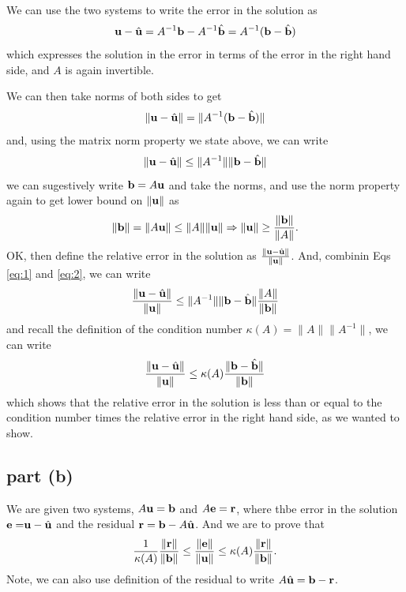 \documentclass[12pt]{article}
\begin{document}
We can use the two systems to write the error in the solution as
\begin{equation}
    {\bf u} - \hat{\bf u} = A^{-1}{\bf b} - A^{-1}\hat{\bf b} = A^{-1}({\bf b} - \hat{\bf b})
\end{equation}
which expresses the solution in the error in terms of the error in the right hand side, and $A$ is again invertible. 

We can then take norms of both sides to get
\begin{equation}
    \|{\bf u} - \hat{\bf u}\| = \|A^{-1}({\bf b} - \hat{\bf b})\| 
\end{equation}
and, using the matrix norm property we state above, we can write
\begin{equation}
    \|{\bf u} - \hat{\bf u}\| \leq \|A^{-1}\| \|{\bf b} - \hat{\bf b}\|
    \label{eq:1}
\end{equation}
we can sugestively write ${\bf b} = A{\bf u}$ and take the norms, and use the norm property again to get lower bound on $\|{\bf u}\|$ as
\begin{equation}    
    \|{\bf b}\| = \|A{\bf u}\| \leq \|A\| \|{\bf u}\| \Rightarrow \|{\bf u}\| \geq \frac{\|{\bf b}\|}{\|A\|}.
    \label{eq:2}
\end{equation}
OK, then define the relative error in the solution as $\frac{\|{\bf u} - \hat{\bf u}\|}{\|{\bf u}\|}$. And, combinin Eqs \ref{eq:1} and \ref{eq:2}, we can write
\begin{equation}
    \frac{\|{\bf u} - \hat{\bf u}\|}{\|{\bf u}\|} \leq \|A^{-1}\| \|{\bf b} - \hat{\bf b}\| \frac{\|A\|}{\|{\bf b}\|}
\end{equation}
and recall the definition of the condition number $\kappa(A) = \|A\| \|A^{-1}\|$, we can write
\begin{equation}
    \frac{\|{\bf u} - \hat{\bf u}\|}{\|{\bf u}\|} \leq \kappa(A) \frac{\|{\bf b} - \hat{\bf b}\|}{\|{\bf b}\|}
\end{equation}
which shows that the relative error in the solution is less than or equal to the condition number times the relative error in the right hand side, as we wanted to show.    


\subsection{part (b)}
We are given two systems, $A {\bf u} = {\bf b}$ and $A {\bf e} = {\bf r}$, where thbe error in the solution ${\bf e = }{\bf u} - \hat{\bf u}$ and the residual ${\bf r} = {\bf b} - A\hat{\bf u}$. And we are to prove that 
\begin{equation}
\dfrac{1}{\kappa(A)} \dfrac{\|{\bf r}\|}{\|{\bf b}\|} \leq \dfrac{\|{\bf e}\|}{\|{\bf u}\|} \leq \kappa(A) \dfrac{\|{\bf r}\|}{\|{\bf b}\|}.
\end{equation}
Note, we can also use definition of the residual to write $A\hat{\bf u} = {\bf b} - {\bf r}$. 
\end{document}
